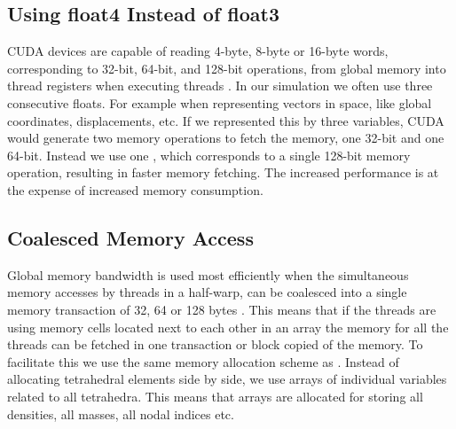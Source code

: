 
\subsection{Using float4 Instead of float3}
CUDA devices are capable of reading 4-byte, 8-byte or 16-byte words,
corresponding to 32-bit, 64-bit, and 128-bit operations,
from global memory into thread registers when executing threads
.
%
In our simulation we often use three consecutive floats. For example when
representing vectors in space, like global coordinates, displacements,
etc. If we represented this by three  variables, CUDA would
generate two memory operations to fetch the memory, one 32-bit and one
64-bit. Instead we use one , which corresponds to a
single 128-bit memory operation, resulting in faster memory
fetching. The increased performance is at the expense of increased
memory consumption.

\subsection{Coalesced Memory Access}
Global memory bandwidth is used most efficiently when the simultaneous
memory accesses by threads in a half-warp, can be coalesced into a
single memory transaction of 32, 64 or 128 bytes
.
%
This means that if the threads are using memory cells located
next to each other in an array the memory for all the threads
can be fetched in one transaction or block copied of the memory.
%
To facilitate this we use the same memory allocation scheme as 
. Instead of allocating
tetrahedral elements side by side, we use arrays of individual
variables related to all tetrahedra. This means that arrays are
allocated for storing all densities, all masses, all nodal indices
etc.


